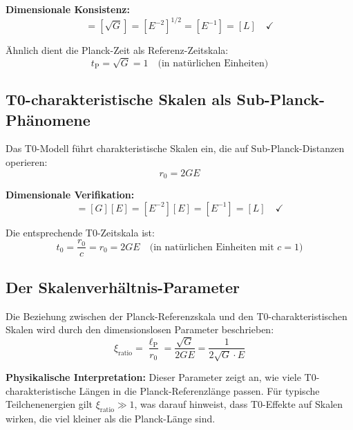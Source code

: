 \documentclass[12pt,a4paper]{report}
\newcommand{\lP}{\ell_{\text{P}}}         %
\newcommand{\tP}{t_{\text{P}}}            %
\newcommand{\rzero}{r_0}                  %
\newcommand{\tzero}{t_0}                  %
\newcommand{\xirat}{\xi_{\text{ratio}}}   %
\begin{document}
	\textbf{Dimensionale Konsistenz:}
	\begin{equation}
		[\lP] = [\sqrt{G}] = [E^{-2}]^{1/2} = [E^{-1}] = [L] \quad \checkmark
	\end{equation}
	
	Ähnlich dient die Planck-Zeit als Referenz-Zeitskala:
	\begin{equation}
		\tP = \sqrt{G} = 1 \quad \text{(in natürlichen Einheiten)}
	\end{equation}
	
	\subsection{T0-charakteristische Skalen als Sub-Planck-Phänomene}\label{subsec:t0_sub_planck}
	
	Das T0-Modell führt charakteristische Skalen ein, die auf Sub-Planck-Distanzen operieren:
	\begin{equation}
		\boxed{\rzero = 2GE}
		\label{eq:t0_characteristic_length}
	\end{equation}
	
	\textbf{Dimensionale Verifikation:}
	\begin{equation}
		[\rzero] = [G][E] = [E^{-2}][E] = [E^{-1}] = [L] \quad \checkmark
	\end{equation}
	
	Die entsprechende T0-Zeitskala ist:
	\begin{equation}
		\tzero = \frac{\rzero}{c} = \rzero = 2GE \quad \text{(in natürlichen Einheiten mit } c = 1\text{)}
	\end{equation}
	
	\subsection{Der Skalenverhältnis-Parameter}\label{subsec:scale_ratio}
	
	Die Beziehung zwischen der Planck-Referenzskala und den T0-charakteristischen Skalen wird durch den dimensionslosen Parameter beschrieben:
	\begin{equation}
		\boxed{\xirat = \frac{\lP}{\rzero} = \frac{\sqrt{G}}{2GE} = \frac{1}{2\sqrt{G} \cdot E}}
		\label{eq:scale_ratio}
	\end{equation}
	
	\textbf{Physikalische Interpretation:} Dieser Parameter zeigt an, wie viele T0-charakteristische Längen in die Planck-Referenzlänge passen. Für typische Teilchenenergien gilt $\xirat \gg 1$, was darauf hinweist, dass T0-Effekte auf Skalen wirken, die viel kleiner als die Planck-Länge sind.
	
\end{document}
